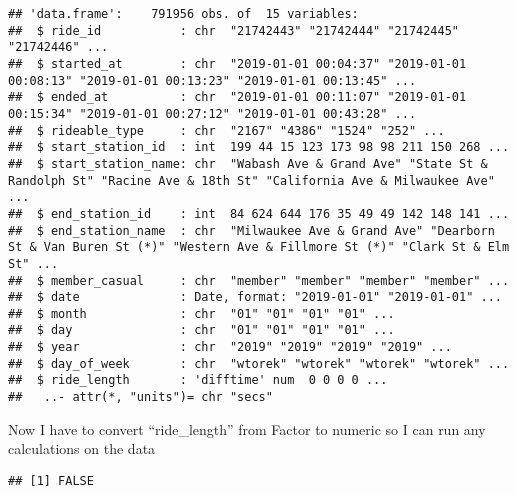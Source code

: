 \documentclass[
]{article}
\newenvironment{Shaded}{\begin{snugshade}}{\end{snugshade}}
\newcommand{\FunctionTok}[1]{\textcolor[rgb]{0.13,0.29,0.53}{\textbf{#1}}}
\newcommand{\NormalTok}[1]{#1}
\newcommand{\OtherTok}[1]{\textcolor[rgb]{0.56,0.35,0.01}{#1}}
\newcommand{\SpecialCharTok}[1]{\textcolor[rgb]{0.81,0.36,0.00}{\textbf{#1}}}
\begin{document}
\begin{verbatim}
## 'data.frame':    791956 obs. of  15 variables:
##  $ ride_id           : chr  "21742443" "21742444" "21742445" "21742446" ...
##  $ started_at        : chr  "2019-01-01 00:04:37" "2019-01-01 00:08:13" "2019-01-01 00:13:23" "2019-01-01 00:13:45" ...
##  $ ended_at          : chr  "2019-01-01 00:11:07" "2019-01-01 00:15:34" "2019-01-01 00:27:12" "2019-01-01 00:43:28" ...
##  $ rideable_type     : chr  "2167" "4386" "1524" "252" ...
##  $ start_station_id  : int  199 44 15 123 173 98 98 211 150 268 ...
##  $ start_station_name: chr  "Wabash Ave & Grand Ave" "State St & Randolph St" "Racine Ave & 18th St" "California Ave & Milwaukee Ave" ...
##  $ end_station_id    : int  84 624 644 176 35 49 49 142 148 141 ...
##  $ end_station_name  : chr  "Milwaukee Ave & Grand Ave" "Dearborn St & Van Buren St (*)" "Western Ave & Fillmore St (*)" "Clark St & Elm St" ...
##  $ member_casual     : chr  "member" "member" "member" "member" ...
##  $ date              : Date, format: "2019-01-01" "2019-01-01" ...
##  $ month             : chr  "01" "01" "01" "01" ...
##  $ day               : chr  "01" "01" "01" "01" ...
##  $ year              : chr  "2019" "2019" "2019" "2019" ...
##  $ day_of_week       : chr  "wtorek" "wtorek" "wtorek" "wtorek" ...
##  $ ride_length       : 'difftime' num  0 0 0 0 ...
##   ..- attr(*, "units")= chr "secs"
\end{verbatim}

Now I have to convert ``ride\_length'' from Factor to numeric so I can
run any calculations on the data

\begin{Shaded}
\end{Shaded}

\begin{verbatim}
## [1] FALSE
\end{verbatim}

\begin{Shaded}
\end{Shaded}
\end{document}
